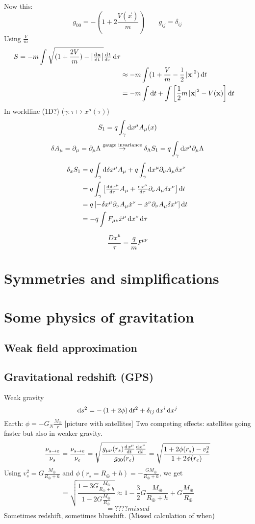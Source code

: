 Now this:
\[ g_{00} = -(1+2 \frac{V(\vec{x})}{m}) \qquad g_{ij} = \delta_{ij} \]
Using $\frac{V}{m}$
\begin{align*}
S = -m \int \sqrt{(1+\frac{2V}{m})- \left|\od{\vec{x}}{t} \right|} \od{t}{\tau} \diff{\tau} \\
&\approx -m \int (1+\frac{V}{m}- \frac{1}{2}\left|\vec{x}\right|^2) \diff{t} \\
&= -m \int \diff{t} + \int \left[\frac{1}{2}m \left|\vec{x}\right|^2 - V(\vec{x})\right] \diff{t}
\end{align*}
In worldline (1D?) ($\gamma:\tau \mapsto x^\mu(\tau)$)
\[ S_1 = q \int_\gamma \operatorname{d \!}{x}^\mu A_\mu(x) \]
\[ \delta A_\mu = \partial_\mu = \partial_\mu \Lambda \overset{\text{gauge invariance}}{\to}  \delta_\Lambda S_1 = q \int_\gamma \operatorname{d \!}{x}^\mu \partial_\mu \Lambda \]
\begin{align*}
\delta_xS_1 &= q \int_\gamma \diff{\delta x^\mu} A_{\mu} + q \int_{\gamma} \diff{x}^\mu \partial_\nu A_\mu \delta x^\nu \\
&= q \int_\gamma \left[ \od{\delta x^\mu}{\tau}  A_{\mu} + \od{{x}^\mu}{\tau} \partial_\nu A_\mu \delta x^\nu \right] \diff{t} \\
&= q \left[ -\delta x^\mu \partial_\nu  A_{\mu} \dot{x}^\nu + \dot{x}^\nu \partial_\nu A_\mu \delta x^\nu \right] \diff{t} \\
&= -q \int F_{\mu\nu} \dot{x}^\mu \diff{x^\nu}\diff{\tau}
\end{align*}

\[ \frac{D \dot{x}^\mu}{\tau} = \frac{q}{m}F^{\mu\nu} \]


\chapter{Symmetries and simplifications}

\chapter{Some physics of gravitation}
\section{Weak field approximation}
\section{Gravitational redshift (GPS)}
Weak gravity
\[ \operatorname{d \!}{s}^2 = - \left(1+2\phi\right)\operatorname{d \!}{t}^2 + \delta_{ij}\operatorname{d \!}{x}^i \operatorname{d \!}{x}^j \]
Earth: $\phi = -G_N \frac{M_\oplus}{r}$
[picture with satellites]
Two competing effects: satellites going faster but also in weaker gravity.
\[ \frac{\nu_{s\to e}}{\nu_s} = \frac{\nu_{s\to e}}{\nu_e} = \sqrt{\frac{g_{\mu\nu}(r_s)\od{x^\mu}{t}\od{x^\nu}{t}}{g_{00}(r_e)}} = \sqrt{\frac{1+2\phi(r_s)-v_s^2}{1+2\phi(r_e)}} \]
Using $v_s^2 = G \frac{M_\oplus}{R_\oplus+h}$ and $\phi(r_s = R_\oplus + h) = - \frac{GM_\oplus}{R_\oplus + h}$, we get
\[ = \sqrt{\frac{1-3G \frac{M_\oplus}{R_\oplus + h}}{1-2G \frac{M_\oplus}{R_\oplus}}} \approx 1 - \frac{3}{2} G \frac{M_\oplus}{R_\oplus + h} + G \frac{M_\oplus}{R_\oplus} \]
\[ = ???? missed \]
Sometimes redshift, sometimes blueshift. (Missed calculation of when)
